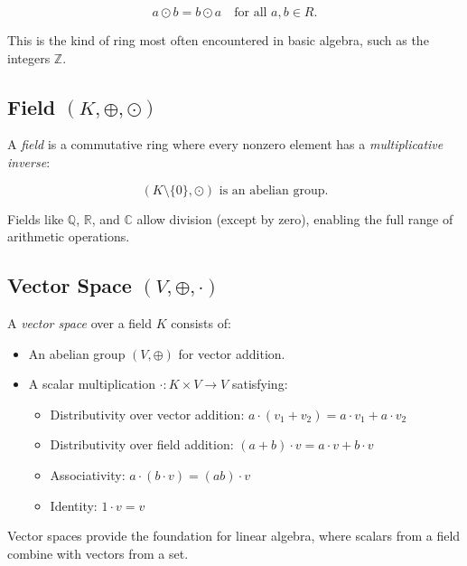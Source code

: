 \[
a \odot b = b \odot a \quad \text{for all } a, b \in R.
\]

This is the kind of ring most often encountered in basic algebra, such as the integers \(\mathbb{Z}\).

\subsection{Field \texorpdfstring{\((K, \oplus, \odot)\)}{}}
A \emph{field} is a commutative ring where every nonzero element has a \emph{multiplicative inverse}:

\[
(K \setminus \{0\}, \odot) \text{ is an abelian group}.
\]

Fields like \(\mathbb{Q}\), \(\mathbb{R}\), and \(\mathbb{C}\) allow division (except by zero), enabling the full range of arithmetic operations.

\subsection{Vector Space \texorpdfstring{\((V, \oplus, \cdot)\)}{}}

A \emph{vector space} over a field \(K\) consists of:
\begin{itemize}[label=\(-\)]
  \item An abelian group \((V, \oplus)\) for vector addition.
  \item A scalar multiplication \(\cdot: K \times V \to V\) satisfying:
  \begin{itemize}
    \item Distributivity over vector addition: \(a \cdot (v_1 + v_2) = a \cdot v_1 + a \cdot v_2\)
    \item Distributivity over field addition: \((a + b) \cdot v = a \cdot v + b \cdot v\)
    \item Associativity: \(a \cdot (b \cdot v) = (ab) \cdot v\)
    \item Identity: \(1 \cdot v = v\)
  \end{itemize}
\end{itemize}

Vector spaces provide the foundation for linear algebra, where scalars from a field combine with vectors from a set.

